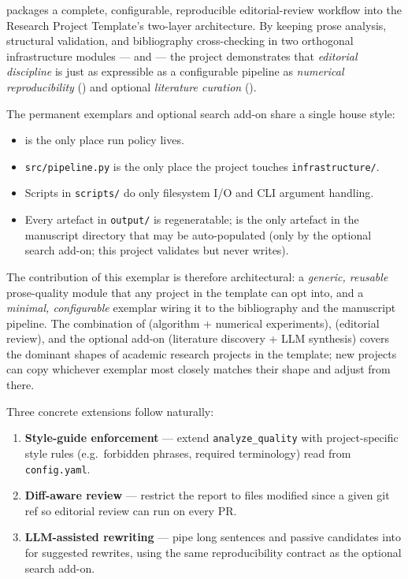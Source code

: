 \documentclass[
]{article}
\providecommand{\tightlist}{%
  \setlength{\itemsep}{0pt}\setlength{\parskip}{0pt}}
\begin{document}
 packages a complete, configurable,
reproducible editorial-review workflow into the Research Project
Template's two-layer architecture. By keeping prose analysis, structural
validation, and bibliography cross-checking in two orthogonal
infrastructure modules ---  and
 --- the project demonstrates that
\emph{editorial discipline} is just as expressible as a configurable
pipeline as \emph{numerical reproducibility}
() and optional \emph{literature
curation} ().

The permanent exemplars and optional search add-on share a single house
style:

\begin{itemize}
\tightlist
\item
   is the only place run policy lives.
\item
  \texttt{src/pipeline.py} is the only place the project touches
  \texttt{infrastructure/}.
\item
  Scripts in \texttt{scripts/} do only filesystem I/O and CLI argument
  handling.
\item
  Every artefact in \texttt{output/} is regeneratable;
   is the only artefact in the
  manuscript directory that may be auto-populated (only by the optional
  search add-on; this project validates but never writes).
\end{itemize}

The contribution of this exemplar is therefore architectural: a
\emph{generic, reusable} prose-quality module that any project in the
template can opt into, and a \emph{minimal, configurable} exemplar
wiring it to the bibliography and the manuscript pipeline. The
combination of  (algorithm + numerical
experiments),  (editorial review), and
the optional  add-on
(literature discovery + LLM synthesis) covers the dominant shapes of
academic research projects in the template; new projects can copy
whichever exemplar most closely matches their shape and adjust from
there.

Three concrete extensions follow naturally:

\begin{enumerate}
\def\labelenumi{\arabic{enumi}.}
\tightlist
\item
  \textbf{Style-guide enforcement} --- extend \texttt{analyze\_quality}
  with project-specific style rules (e.g.~forbidden phrases, required
  terminology) read from \texttt{config.yaml}.
\item
  \textbf{Diff-aware review} --- restrict the report to files modified
  since a given git ref so editorial review can run on every PR.
\item
  \textbf{LLM-assisted rewriting} --- pipe long sentences and passive
  candidates into  for suggested rewrites,
  using the same  reproducibility
  contract as the optional search add-on.
\end{enumerate}
\end{document}
